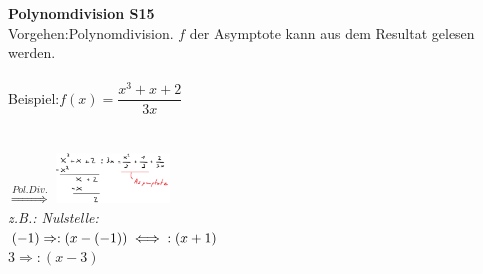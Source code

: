 	\begin{minipage}[b]{0.17\textwidth}
		\textbf{Polynomdivision {\color{red} S15}}\\
			Vorgehen:\quad Polynomdivision. $f$ der Asymptote kann aus dem Resultat gelesen werden.\\
			\\
			Beispiel:\qquad $f(x)=\dfrac{x^{3}+x+2}{3x}$ \\
			\\
			\\
			$\overset{Pol.Div.}{\Longrightarrow}$ \qquad \includegraphics[width=3cm]{images/Skizze.png} \qquad\\
			\textit{z.B.: Nulstelle: }\\
				 $ (-1) \Rightarrow :(x-(-1)) \iff \thickspace :(x+1) $\\
				 $ 3 \Rightarrow :(x-3)$\\[-6ex]
	\end{minipage}%
\hspace{1mm}
\vrule
\hspace{1mm}%
